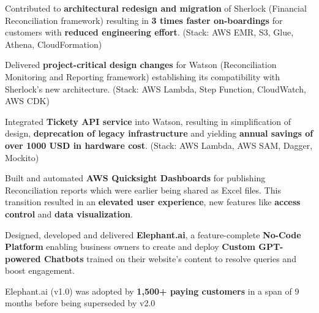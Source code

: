 \documentclass[]{deedy-resume-openfont}
\begin{document}
\begin{tightemize}

\item Contributed to \textbf{architectural redesign and migration} of Sherlock (Financial Reconciliation framework) resulting in \textbf{3 times faster on-boardings} for customers with \textbf{reduced engineering effort}.\:\: (Stack: {AWS EMR}, {S3}, {Glue}, {Athena}, {CloudFormation})

\item Delivered \textbf{project-critical design changes} for Watson (Reconciliation Monitoring and Reporting framework) establishing its compatibility with Sherlock's new architecture.\:\: (Stack: {AWS Lambda}, {Step Function}, {CloudWatch}, {AWS CDK})

\item Integrated \textbf{Tickety API service} into Watson, resulting in simplification of design, \textbf{deprecation of legacy infrastructure} and yielding \textbf{annual savings of over 1000 USD in hardware cost}.\:\: (Stack: {AWS Lambda}, {AWS SAM}, {Dagger}, {Mockito})

\item Built and automated \textbf{AWS Quicksight Dashboards} for publishing Reconciliation reports which were earlier being shared as Excel files. This transition resulted in an \textbf{elevated user experience}, new features like \textbf{access control} and \textbf{data visualization}.

\end{tightemize}
\sectionsep

\begin{tightemize}
\item Designed, developed and delivered \textbf{Elephant.ai}, a feature-complete \textbf{No-Code Platform} enabling business owners to create and deploy \textbf{Custom GPT-powered Chatbots} trained on their website's content to resolve queries and boost engagement.
\item Elephant.ai (v1.0) was adopted by \textbf{1,500+ paying customers} in a span of 9 months before being superseded by  v2.0
\end{tightemize}
\sectionsep
\end{document}
